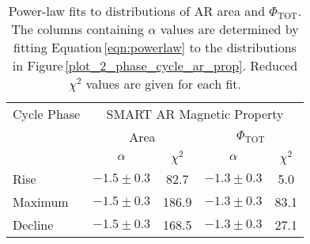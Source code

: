 \documentclass[namedreferences]{solarphysics}
\begin{document}
\begin{article}


\begin{table}[!t]
\caption{Power-law fits to distributions of AR area and $\Phi_{\mathrm{TOT}}$. The columns containing $\alpha$ values are determined by fitting Equation\,\ref{eqn:powerlaw} to the distributions in Figure\,\ref{plot_2_phase_cycle_ar_prop}. Reduced $ \chi^2 $ values are given for each fit.}
\label{table_2_plaw_fits}
\begin{tabular}{lcccc}
\hline
Cycle Phase & \multicolumn{4}{c}{SMART AR Magnetic Property}  \\ 
            & \multicolumn{2}{c}{Area} & \multicolumn{2}{c}{$\Phi_{\mathrm{TOT}}$}  \\ 
            & $\alpha$       & $\chi^2$ & $\alpha$       & $\chi^2$ \\ 
\hline
Rise        & $-1.5 \pm 0.3$ &  82.7    & $-1.3 \pm 0.3$ &  5.0     \\ 
Maximum     & $-1.5 \pm 0.3$ & 186.9    & $-1.3 \pm 0.3$ & 83.1     \\ 
Decline     & $-1.5 \pm 0.3$ & 168.5    & $-1.3 \pm 0.3$ & 27.1     \\ 
\hline
\end{tabular}
\end{table}



\end{article}
\end{document}
